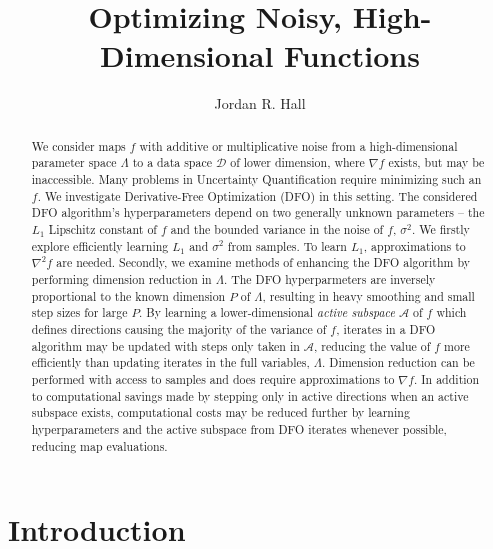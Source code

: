\documentclass{amsart}
\begin{document}
\begin{abstract}

  
We consider maps $f$ with additive or multiplicative noise from a high-dimensional parameter space $\Lambda$ to a data space $\mathcal{D}$ of lower dimension, where $\nabla f$ exists, but may be inaccessible. Many problems in Uncertainty Quantification require minimizing such an $f$. We investigate Derivative-Free Optimization (DFO) in this setting. The considered DFO algorithm's hyperparameters depend on two generally unknown parameters -- the $L_1$ Lipschitz constant of $f$ and the bounded variance in the noise of $f$, $\sigma^2$. We firstly explore efficiently learning $L_1$ and $\sigma^2$ from samples. To learn $L_1$, approximations to $\nabla^2 f$ are needed. 
Secondly, we examine methods of enhancing the DFO algorithm by performing dimension reduction in $\Lambda$.  
The DFO hyperparmeters are inversely proportional to the known dimension $P$ of $\Lambda$, resulting in heavy smoothing and small step sizes for large $P$.
By learning a lower-dimensional \textit{active subspace} $\mathcal{A}$ of $f$ which defines directions causing the majority of the variance of $f$, iterates in a DFO algorithm may be updated with steps only taken in $\mathcal{A}$, reducing the value of $f$ more efficiently than updating iterates in the full variables, $\Lambda$. 
Dimension reduction can be performed with access to samples  and does require approximations to $\nabla f$. In addition to computational savings made by stepping only in active directions when an active subspace exists, computational costs may be reduced further by learning hyperparameters and the active subspace from DFO iterates whenever possible, reducing map evaluations.

 

\end{abstract}


\title{Optimizing Noisy, High-Dimensional Functions}

\author{Jordan R. Hall}

\maketitle



\tableofcontents

\setcounter{tocdepth}{0}



\newpage


\section{Introduction}
\end{document}
